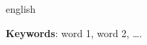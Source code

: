 \begin{resumo}[Abstract]
 	\begin{otherlanguage*}{english}
  
  		\lipsum[1] 

   		\vspace{\onelineskip}
 
		\noindent 
		\textbf{Keywords}:  word 1, word 2, \ldots.
 	\end{otherlanguage*}
\end{resumo}